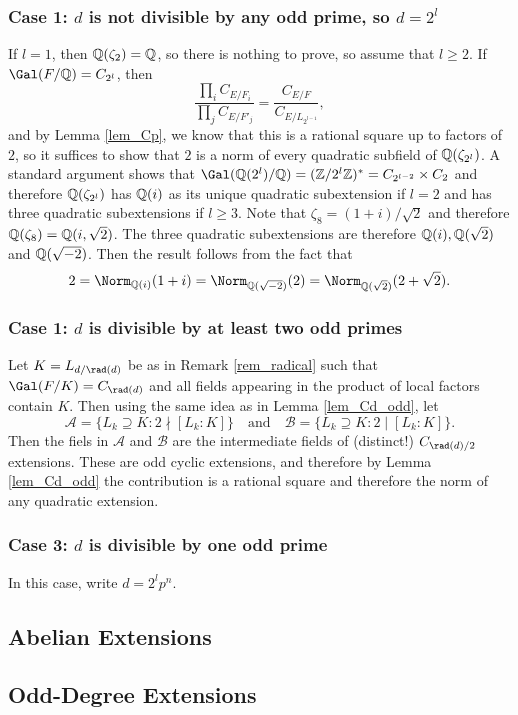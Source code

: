 \subsubsection*{Case 1: $d$ is not divisible by any odd prime, so $d=2^l$}
If $l=1$, then $\mathbb{Q}(\zeta_2)=\mathbb{Q}$, so there is nothing to prove, so assume that $l\geq2$. If $\Gal(F/\QQ)=C_{2^l}$, then 
$$\frac{\prod_i C_{E/F_i}}{\prod_j C_{E/F'_j}}=\frac{C_{E/F}}{C_{E/L_{2^{l-1}}}},$$
and by Lemma \ref*{lem_Cp}, we know that this is a rational square up to factors of $2$, so it suffices to show that $2$ is a norm of every quadratic subfield of $\mathbb{Q}(\zeta_{2^l})$. A standard argument shows that $\Gal(\QQ(2^l)/\QQ)=(\ZZ/2^l\ZZ)^*=C_{2^{l-2}}\times C_2$ and therefore $\mathbb{Q}(\zeta_{2^l})$ has $\mathbb{Q}(i)$ as its unique quadratic subextension if $l=2$ and has three quadratic subextensions if $l\geq 3$. Note that $\zeta_8=(1+i)/\sqrt{2}$ and therefore $\mathbb{Q}(\zeta_8)=\mathbb{Q}(i,\sqrt{2})$. The three quadratic subextensions are therefore $\mathbb{Q}(i), \mathbb{Q}(\sqrt{2})$ and $\mathbb{Q}(\sqrt{-2})$. Then the result follows from the fact that 
$$2=\Norm_{\QQ(i)}(1+i)=\Norm_{\QQ(\sqrt{-2})}(2)=\Norm_{\QQ(\sqrt{2})}(2+\sqrt{2}).$$

\subsubsection*{Case 1: $d$ is divisible by at least two odd primes}
Let $K=L_{d/\rad(d)}$ be as in Remark \ref*{rem_radical} such that $\Gal(F/K)=C_{\rad(d)}$ and all fields appearing in the product of local factors contain $K$. Then using the same idea as in Lemma \ref*{lem_Cd_odd}, let 
$$\mathcal{A}=\{L_k\supseteq K:2\nmid [L_k:K]\}\quad\text{and}\quad\mathcal{B}=\{L_k\supseteq K:2\mid [L_k:K]\}.$$
Then the fiels in $\mathcal{A}$ and $\mathcal{B}$ are the intermediate fields of (distinct!) $C_{\rad(d)/2}$ extensions. These are odd cyclic extensions, and therefore by Lemma \ref*{lem_Cd_odd} the contribution is a rational square and therefore the norm of any quadratic extension.

\subsubsection*{Case 3: $d$ is divisible by one odd prime}
In this case, write $d=2^lp^n$.


\subsection{Abelian Extensions}

\subsection{Odd-Degree Extensions}